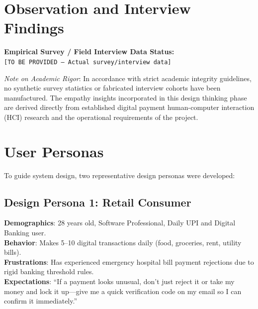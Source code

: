 \section{Observation and Interview Findings}
\noindent
\textbf{Empirical Survey / Field Interview Data Status:}\\
\texttt{[TO BE PROVIDED --- Actual survey/interview data]}

\textit{Note on Academic Rigor}: In accordance with strict academic integrity guidelines, no synthetic survey statistics or fabricated interview cohorts have been manufactured. The empathy insights incorporated in this design thinking phase are derived directly from established digital payment human-computer interaction (HCI) research and the operational requirements of the project.

\section{User Personas}
To guide system design, two representative design personas were developed:

\subsection{Design Persona 1: Retail Consumer}
\begin{tcolorbox}[colback=lightgraybg, colframe=secondaryblue, title=\textbf{\color{white}Design Persona: Ananya Sharma (Retail Digital Transactor)}, arc=3pt]
\textbf{Demographics}: 28 years old, Software Professional, Daily UPI and Digital Banking user.\\
\textbf{Behavior}: Makes 5--10 digital transactions daily (food, groceries, rent, utility bills).\\
\textbf{Frustrations}: Has experienced emergency hospital bill payment rejections due to rigid banking threshold rules.\\
\textbf{Expectations}: ``If a payment looks unusual, don't just reject it or take my money and lock it up—give me a quick verification code on my email so I can confirm it immediately.''
\end{tcolorbox}

